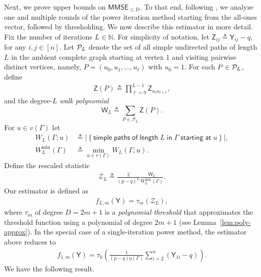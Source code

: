 \documentclass[12pt]{article}
\newcommand{\abs}[1]{\left|#1\right|}
\newcommand{\calP}{{\cal P}}
\newcommand{\p}[1]{\left(#1\right)}
\newcommand{\ppp}[1]{\left\{#1\right\}}
\newcommand{\s}[1]{\mathsf{#1}}
\begin{document}
Next, we prove upper bounds on $\s{MMSE}_{\leq D}$. To that end, following \cite[Sec. 4.2]{SchrammWein2022}, we analyze one and multiple rounds of the power iteration method starting from the all-ones vector, followed by thresholding. We now describe this estimator in more detail. Fix the number of iterations $L\in\mathbb{N}$. For simplicity of notation, let $\s{Z}_{ij}\triangleq\s{Y}_{ij}-q$, for any $i,j\in[n]$. Let $\calP_L$ denote the set of all simple undirected paths of length $L$ in the ambient complete graph starting at vertex $1$ and visiting pairwise distinct vertices, namely, $P=(u_0,u_1,\dots,u_\ell)$ with $u_0=1$. For each $P\in\calP_L$, define
\begin{align}
    \s{Z}(P)\triangleq\prod_{\ell=0}^{L-1} \s{Z}_{u_t u_{t+1}},
\end{align}
and the degree-$L$ \emph{walk polynomial}
\begin{equation}
\s{W}_L\triangleq\sum_{P\in\mathcal{P}_L}\s{Z}(P).
\end{equation}
For $u\in v(\Gamma)$ let
\begin{align}
W_L(\Gamma;u)&\triangleq\abs{\ppp{\s{simple}\;\s{paths}\;\s{of}\;\s{length}\;L\;\s{in}\;\Gamma\;\s{ starting}\;\s{at}\;u}},\\
    W_L^{\min}(\Gamma)&\triangleq\min_{u\in v(\Gamma)} W_L(\Gamma;u).
\end{align}
Define the rescaled statistic 
\begin{align}
\mathscr{Z}_L\triangleq \frac{2}{(p-q)^L}\frac{\s{W}_L}{W_L^{\min}(\Gamma)}.    
\end{align}
Our estimator is defined as
\begin{align}
f_{L,m}(\s{Y})=\tau_m(\mathscr{Z}_L),\label{eqn:EstL}
\end{align}
where $\tau_m$ of degree $D=2m+1$ is a \emph{polynomial threshold} that approximates the threshold function using a polynomial of degree $2m+1$ (see Lemma~\ref{lem:poly-approx}). In the special case of a single-iteration power method, the estimator above reduces to
\begin{align}
    f_{1,m}(\s{Y}) = \tau_k\p{\frac{1}{(p-q)\eta(\Gamma)}\sum_{i=2}^n\p{\s{Y}_{1i}-q}}.\label{eqn:EstL1}
\end{align}
We have the following result.
\end{document}
